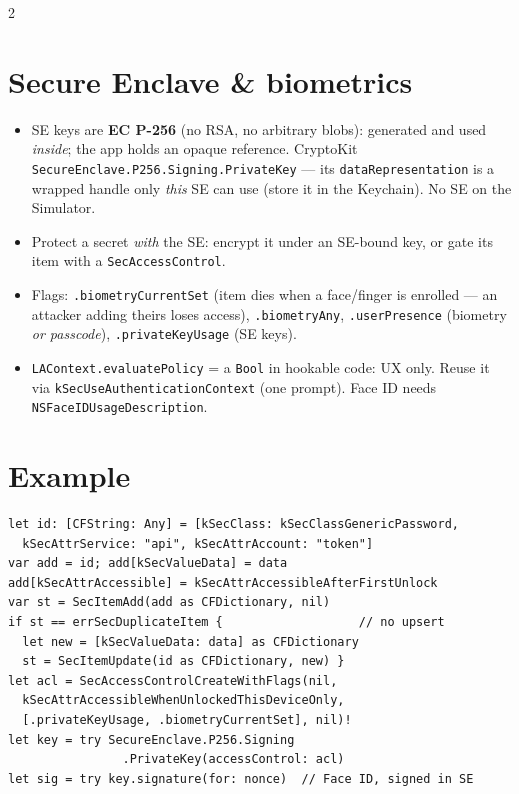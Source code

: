 \documentclass[8pt]{extarticle}
\begin{document}
\begin{multicols}{2}
\section{Secure Enclave \& biometrics}
\begin{itemize}
  \item SE keys are \textbf{EC P-256} (no RSA, no arbitrary blobs):
        generated and used \emph{inside}; the app holds an opaque reference.
        CryptoKit \texttt{SecureEnclave.P256.Signing.PrivateKey} — its
        \texttt{dataRepresentation} is a wrapped handle only \emph{this} SE
        can use (store it in the Keychain). No SE on the Simulator.
  \item Protect a secret \emph{with} the SE: encrypt it under an SE-bound
        key, or gate its item with a \texttt{SecAccessControl}.
  \item Flags: \texttt{.biometryCurrentSet} (item dies when a face/finger is
        enrolled — an attacker adding theirs loses access), \texttt{.biometryAny},
        \texttt{.userPresence} (biometry \emph{or passcode}),
        \texttt{.privateKeyUsage} (SE keys).
  \item \texttt{LAContext.evaluatePolicy} = a \texttt{Bool} in hookable code:
        UX only. Reuse it via \texttt{kSecUseAuthenticationContext} (one
        prompt). Face ID needs \texttt{NSFaceIDUsageDescription}.
\end{itemize}

\section{Example}
\begin{lstlisting}[language=SwiftSheet]
let id: [CFString: Any] = [kSecClass: kSecClassGenericPassword,
  kSecAttrService: "api", kSecAttrAccount: "token"]
var add = id; add[kSecValueData] = data
add[kSecAttrAccessible] = kSecAttrAccessibleAfterFirstUnlock
var st = SecItemAdd(add as CFDictionary, nil)
if st == errSecDuplicateItem {                   // no upsert
  let new = [kSecValueData: data] as CFDictionary
  st = SecItemUpdate(id as CFDictionary, new) }
let acl = SecAccessControlCreateWithFlags(nil,
  kSecAttrAccessibleWhenUnlockedThisDeviceOnly,
  [.privateKeyUsage, .biometryCurrentSet], nil)!
let key = try SecureEnclave.P256.Signing
                .PrivateKey(accessControl: acl)
let sig = try key.signature(for: nonce)  // Face ID, signed in SE
\end{lstlisting}

\columnbreak


\end{multicols}
\end{document}

